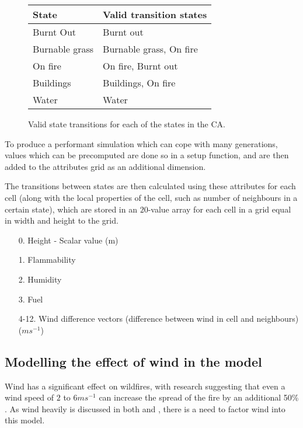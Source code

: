 \documentclass[11pt, a4paper, titlepage]{article}
\begin{document}
\begin{figure}[h]
  \centering
    \begin{tabular}{ || l | l ||}
      \hline
      \textbf{State}            &  \textbf{Valid transition states}  \\ 
      \hline
      Burnt Out        &  Burnt out           \\       
      Burnable grass         &  Burnable grass, On fire   \\
      On fire          &  On fire, Burnt out  \\   
      Buildings          &  Buildings, On fire  \\   
      Water     &  Water        \\
      \hline
 
    \end{tabular}
  \caption{Valid state transitions for each of the states in the CA.}
  \label{Valid state transitions}
\end{figure}

To produce a performant simulation which can cope with many generations, values which can be precomputed are done so in a setup function, and are then added to the attributes grid as an additional dimension.

The transitions between states are then calculated using these attributes for each cell (along with the local properties of the cell, such as number of neighbours in a certain state), which are stored in an $20$-value array for each cell in a grid equal in width and height to the grid. 

\begin{itemize}
  \item [0.] Height - Scalar value (m)
  \item [1.] Flammability
  \item [2.] Humidity
  \item [3.] Fuel
  \item [4-12.] Wind difference vectors (difference between wind in cell and neighbours) ($ms^{-1}$)
\end{itemize}

\subsection{Modelling the effect of wind in the model}
Wind has a significant effect on wildfires, with research suggesting that even a wind speed of $2$ to $6ms^{-1}$ can increase the spread of the fire by an additional 50\% \cite{Beer1991}. As wind heavily is discussed in both \cite{ALEXANDRIDIS2008191} and \cite{HERNANDEZENCINAS20071213}, there is a need to factor wind into this model.
\end{document}
